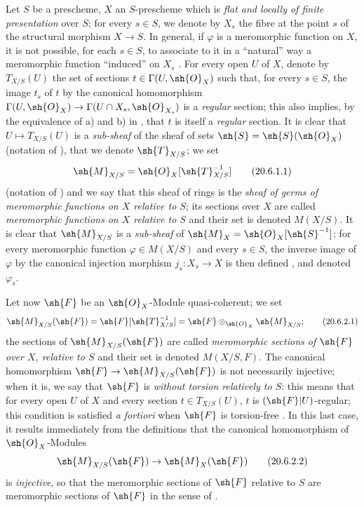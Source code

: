 \begin{env}[20.6.1]
\label{IV.20.6.1}
Let $S$ be a prescheme, $X$ an $S$-prescheme which is \emph{flat and locally of finite presentation} over $S$;
for every $s\in S$, we denote by $X_s$ the fibre at the point $s$ of the structural morphism $X\to S$.
In general, if $\varphi$ is a meromorphic function on $X$, it is not possible, for each $s\in S$, to associate to it in a ``natural'' way a meromorphic function ``induced'' on $X_s$ .
For every open $U$ of $X$, denote by $T_{X/S}(U)$ the set of sections $t\in\Gamma(U,\sh{O}_X)$ such that, for every $s\in S$, the image $t_s$ of $t$ by the canonical homomorphism $\Gamma(U,\sh{O}_X)\to\Gamma(U\cap X_s,\sh{O}_{X_s})$ is a \emph{regular} section;
this also implies, by the equivalence of a) and b) in , that $t$ is itself a \emph{regular} section.
It is clear that $U\mapsto T_{X/S}(U)$ is a \emph{sub-sheaf} of the sheaf of sets $\sh{S}=\sh{S}(\sh{O}_X)$ (notation of ), that we denote $\sh{T}_{X/S}$;
we set
\[
\label{IV.20.6.1.1}
  \sh{M}_{X/S}=\sh{O}_X[\sh{T}_{X/S}^{-1}]
  \tag{20.6.1.1}
\]
(notation of ) and we say that this sheaf of rings is the \emph{sheaf of germs of meromorphic functions on $X$ relative to $S$};
its sections over $X$ are called \emph{meromorphic functions on $X$ relative to $S$} and their set is denoted $M(X/S)$.
It is clear that $\sh{M}_{X/S}$ is a \emph{sub-sheaf} of $\sh{M}_X=\sh{O}_X[\sh{S}^{-1}]$;
for every meromorphic function $\varphi\in M(X/S)$ and every $s\in S$, the inverse image of $\varphi$ by the canonical injection morphism $j_s:X_s\to X$ is then defined , and denoted $\varphi_s$.
\end{env}

\begin{env}[20.6.2]
\label{IV.20.6.2}
Let now $\sh{F}$ be an $\sh{O}_X$-Module quasi-coherent;
we set
\[
\label{IV.20.6.2.1}
  \sh{M}_{X/S}(\sh{F})=\sh{F}[\sh{T}_{X/S}^{-1}]=\sh{F}\otimes_{\sh{O}_X}\sh{M}_{X/S};
  \tag{20.6.2.1}
\]
the sections of $\sh{M}_{X/S}(\sh{F})$ are called \emph{meromorphic sections of $\sh{F}$ over $X$, relative to $S$} and their set is denoted $M(X/S,F)$.
The canonical homomorphism $\sh{F}\to\sh{M}_{X/S}(\sh{F})$ is not necessarily injective;
when it is, we say that $\sh{F}$ is \emph{without torsion relatively to $S$}:
this means that for every open $U$ of $X$ and every section $t\in T_{X/S}(U)$, $t$ is $(\sh{F}|U)$-regular;
this condition is satisfied \emph{a fortiori} when $\sh{F}$ is torsion-free .
In this last case, it results immediately from the definitions  that the canonical homomorphism of $\sh{O}_X$-Modules
\[
\label{IV.20.6.2.2}
  \sh{M}_{X/S}(\sh{F})\to\sh{M}_X(\sh{F})
  \tag{20.6.2.2}
\]
is \emph{injective}, so that the meromorphic sections of $\sh{F}$ relative to $S$ are meromorphic sections of $\sh{F}$ in the sense of .
\end{env}

